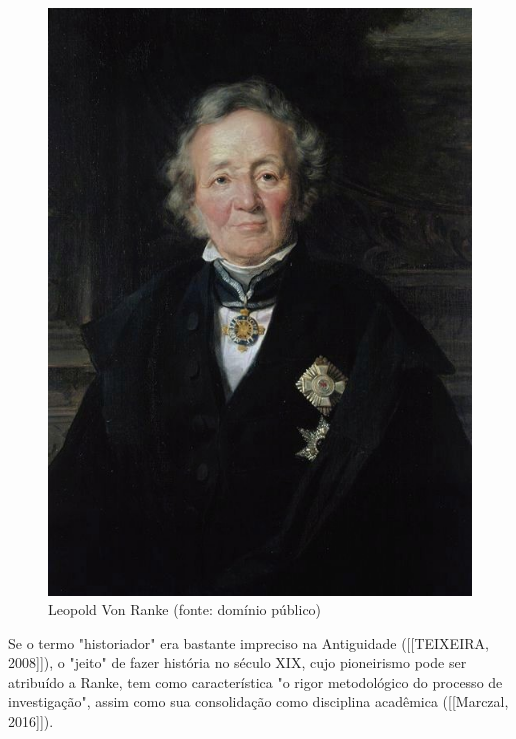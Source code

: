 \captionsetup{format=plain}
\begin{figure}[p]

\centering


\begin{minipage}[b]{0.4\linewidth}
        \centering
                \includegraphics[width=1.0\linewidth]{../../../imagens/ranke.jpg}
                \caption{Leopold Von Ranke (fonte: domínio público)}
                \label{e978df58deaf86ca4da4073fca97b28afd4d3a3b}
\end{minipage}%
\hspace{0.5cm}
\end{figure}



Se o termo "historiador" era bastante impreciso na Antiguidade ([[TEIXEIRA, 2008]]), o "jeito" de fazer história no século XIX, cujo pioneirismo pode ser atribuído a Ranke, tem como característica "o rigor metodológico do processo de investigação", assim como sua consolidação como disciplina acadêmica ([[Marczal, 2016]]).

